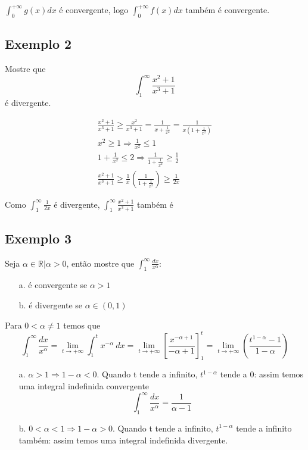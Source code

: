 \documentclass[12pt,openany, letterpaper]{book}
\begin{document}
$\displaystyle{\int_0^{+\infty}g(x)dx }$ é convergente, logo $\displaystyle{\int_0^{+\infty}f(x)dx }$ também  é convergente.

\subsection{Exemplo 2}
\label{sub:ex142}

Mostre que $$ \int_1^{\infty} \frac{x^2+1}{x^3+1} $$ é divergente.

\begin{align}
\frac{x^2+1}{x^3+1} \geq \frac{x^2}{x^3+1} = \frac{1}{x+\frac{1}{x^2}} = \frac{1}{x(1+\frac{1}{x^2})}\\
x^2 \geq 1 \Rightarrow \frac{1}{x^2} \leq 1 \\
1 + \frac{1}{x^2} \leq 2 \Rightarrow \frac{1}{1+\frac{1}{x^2}} \geq \frac{1}{2}\\
\frac{x^2+1}{x^3+1} \geq \frac{1}{x}\left(\frac{1}{1+\frac{1}{x^2}}\right) \geq \frac{1}{2x}
\end{align}

Como $ \displaystyle{\int_1^{\infty} \frac{1}{2x}} $ é divergente, $\displaystyle{ \int_1^{\infty} \frac{x^2+1}{x^3+1}} $ também é

\subsection{Exemplo 3}
\label{sub:ex143}

\hspace{5mm}Seja $\alpha \in \mathds{R} | \alpha >0 $, então mostre que $\displaystyle{\int_1^\infty \frac{dx}{x^\alpha}} $:
\begin{enumerate}
\item [a.] é convergente se $\alpha > 1$\\
\item [b.] é divergente se $\alpha \in (0,1) $
\end{enumerate}

Para $0  < \alpha \neq 1$ temos que $$\displaystyle{\int_1^\infty \frac{dx}{x^\alpha} = \lim_{t \rightarrow +\infty} \int_1^t x^{-\alpha}\ dx = \lim_{t \rightarrow +\infty} \left[ \frac{x^{-\alpha + 1}}{-\alpha + 1}\right]_1^t = \lim_{t \rightarrow +\infty} \left( \frac{t^{1-\alpha}-1}{1-\alpha}\right)}$$

\begin{enumerate}
\item [a.] $\alpha > 1 \Rightarrow 1 - \alpha < 0$. Quando t tende a infinito, $t^{1-\alpha}$ tende a 0: assim temos uma integral indefinida convergente $$\displaystyle{\int_1^\infty \frac{dx}{x^\alpha}} = \frac{1}{\alpha - 1}$$
\item [b.] $0 < \alpha < 1 \Rightarrow 1 - \alpha > 0$. Quando t tende a infinito, $t^{1-\alpha}$ tende a infinito também: assim temos uma integral indefinida divergente.
\end{enumerate}
\end{document}
